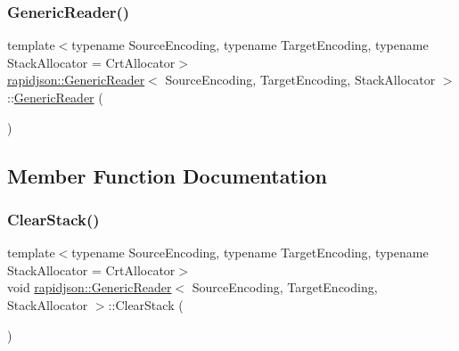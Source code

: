 \subsubsection{\texorpdfstring{GenericReader()}{GenericReader()}\hspace{0.1cm}{\footnotesize\ttfamily [2/2]}}
{\footnotesize\ttfamily template$<$typename Source\+Encoding, typename Target\+Encoding, typename Stack\+Allocator = Crt\+Allocator$>$ \\
\mbox{\hyperlink{classrapidjson_1_1_generic_reader}{rapidjson\+::\+Generic\+Reader}}$<$ Source\+Encoding, Target\+Encoding, Stack\+Allocator $>$\+::\mbox{\hyperlink{classrapidjson_1_1_generic_reader}{Generic\+Reader}} (\begin{DoxyParamCaption}\item[{const \mbox{\hyperlink{classrapidjson_1_1_generic_reader}{Generic\+Reader}}$<$ Source\+Encoding, Target\+Encoding, Stack\+Allocator $>$ \&}]{ }\end{DoxyParamCaption})\hspace{0.3cm}{\ttfamily [private]}}



\subsection{Member Function Documentation}
\mbox{\label{classrapidjson_1_1_generic_reader_a8067bd11e56e539890d10b1817bf4602}} 
\subsubsection{\texorpdfstring{ClearStack()}{ClearStack()}}
{\footnotesize\ttfamily template$<$typename Source\+Encoding, typename Target\+Encoding, typename Stack\+Allocator = Crt\+Allocator$>$ \\
void \mbox{\hyperlink{classrapidjson_1_1_generic_reader}{rapidjson\+::\+Generic\+Reader}}$<$ Source\+Encoding, Target\+Encoding, Stack\+Allocator $>$\+::Clear\+Stack (\begin{DoxyParamCaption}{ }\end{DoxyParamCaption})\hspace{0.3cm}{\ttfamily [private]}}



